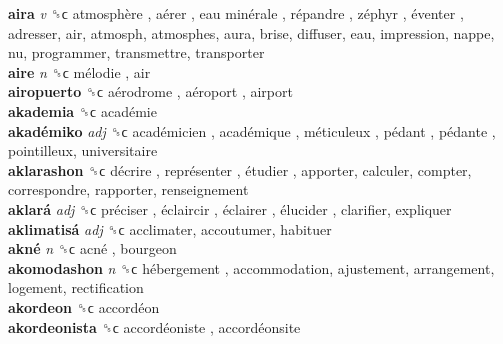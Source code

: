 \textbf{aira} \emph{v}  ␝ϲ   atmosphère ,  aérer ,  eau minérale ,  répandre ,  zéphyr ,  éventer , adresser, air, atmosph, atmosphes, aura, brise, diffuser, eau, impression, nappe, nu, programmer, transmettre, transporter  \\
\textbf{aire} \emph{n}  ␝ϲ   mélodie , air  \\
\textbf{airopuerto} ␝ϲ   aérodrome ,  aéroport , airport  \\
\textbf{akademia} ␝ϲ   académie   \\
\textbf{akadémiko} \emph{adj}  ␝ϲ   académicien ,  académique ,  méticuleux ,  pédant ,  pédante , pointilleux, universitaire  \\
\textbf{aklarashon} ␝ϲ   décrire ,  représenter ,  étudier , apporter, calculer, compter, correspondre, rapporter, renseignement  \\
\textbf{aklará} \emph{adj}  ␝ϲ   préciser ,  éclaircir ,  éclairer ,  élucider , clarifier, expliquer  \\
\textbf{aklimatisá} \emph{adj}  ␝ϲ  acclimater, accoutumer, habituer  \\
\textbf{akné} \emph{n}  ␝ϲ   acné , bourgeon  \\
\textbf{akomodashon} \emph{n}  ␝ϲ   hébergement , accommodation, ajustement, arrangement, logement, rectification  \\
\textbf{akordeon} ␝ϲ   accordéon   \\
\textbf{akordeonista} ␝ϲ   accordéoniste ,  accordéonsite   \\
